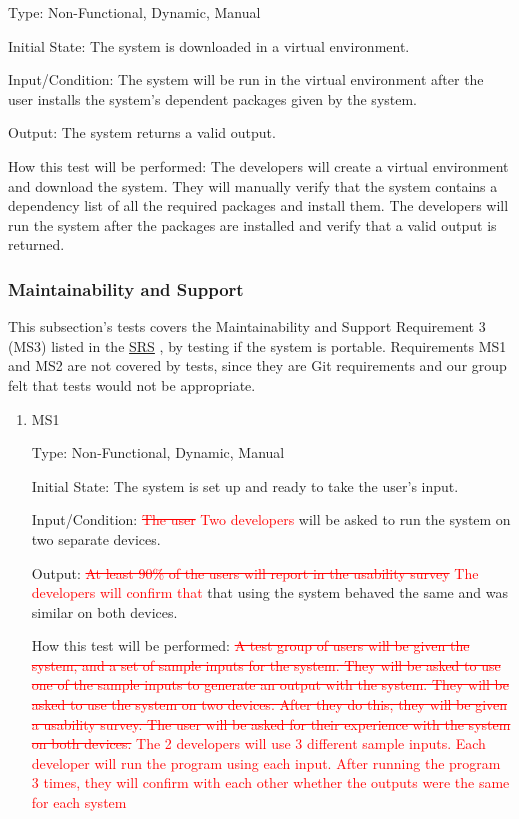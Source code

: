 \documentclass[12pt, titlepage]{article}
\begin{document}
\begin{enumerate}
Type: Non-Functional, Dynamic, Manual
					
Initial State: 
The system is downloaded in a virtual environment.

Input/Condition: 
The system will be run in the virtual environment after the user installs the system's dependent packages given by the system.

Output: 
The system returns a valid output.

How this test will be performed: 
The developers will create a virtual environment and download the system. They will manually verify that the system contains a dependency list of all the required packages and install them. The developers will run the system after the packages are installed and verify that a valid output is returned.

\end{enumerate}

\subsubsection{Maintainability and Support}
This subsection's tests covers the Maintainability and Support Requirement 3 (MS3) listed in the \href{https://github.com/paezha/PyERT-BLACK/blob/main/docs/SRS/SRS.pdf}{SRS} \citep{SRS}, by testing if the system is portable. Requirements MS1 and MS2 are not covered by tests, since they are Git requirements and our group felt that tests would not be appropriate.

\begin{enumerate}

\item{MS1\\}\label{MS1}

Type: Non-Functional, Dynamic, Manual
					
Initial State: 
The system is set up and ready to take the user's input.

Input/Condition: 
\textcolor{red}{\sout{The user} Two developers} will be asked to run the system on two separate devices.

Output: 
\textcolor{red}{\sout{At least 90\% of the users will report in the usability survey} The developers will confirm that} that using the system behaved the same and was similar on both devices.

How this test will be performed: 
\textcolor{red}{\sout{A test group of users will be given the system, and a set of sample inputs for the system. They will be asked to use one of the sample inputs to generate an output with the system. They will be asked to use the system on two devices. After they do this, they will be given a usability survey. The user will be asked for their experience with the system on both devices.} The 2 developers will use 3 different sample inputs. Each developer will run the program using each input. After running the program 3 times, they will confirm with each other whether the outputs were the same for each system} 

\end{enumerate}
\end{document}
